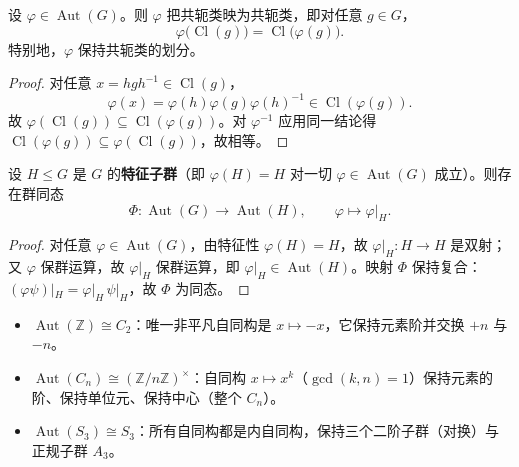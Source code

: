 \begin{property}[自同构保持共轭类]\label{prop:automorphism_preserves_conjugacy}
设 $\varphi \in \operatorname{Aut}(G)$。则 $\varphi$ 把共轭类映为共轭类，即对任意 $g\in G$，
\[
\varphi\bigl(\operatorname{Cl}(g)\bigr) = \operatorname{Cl}\bigl(\varphi(g)\bigr).
\]
特别地，$\varphi$ 保持共轭类的划分。
\end{property}

\begin{proof}
对任意 $x = hgh^{-1} \in \operatorname{Cl}(g)$，
\[
\varphi(x) = \varphi(h)\varphi(g)\varphi(h)^{-1} \in \operatorname{Cl}(\varphi(g)).
\]
故 $\varphi(\operatorname{Cl}(g))\subseteq \operatorname{Cl}(\varphi(g))$。对 $\varphi^{-1}$ 应用同一结论得 $\operatorname{Cl}(\varphi(g))\subseteq \varphi(\operatorname{Cl}(g))$，故相等。
\end{proof}

\begin{lemma}[自同构限制到特征子群]\label{lem:automorphism_restricts_characteristic}
设 $H\le G$ 是 $G$ 的\textbf{特征子群}（即 $\varphi(H)=H$ 对一切 $\varphi\in\operatorname{Aut}(G)$ 成立）。则存在群同态
\[
\Phi: \operatorname{Aut}(G) \to \operatorname{Aut}(H),\qquad \varphi \mapsto \varphi|_H.
\]
\end{lemma}

\begin{proof}
对任意 $\varphi\in\operatorname{Aut}(G)$，由特征性 $\varphi(H)=H$，故 $\varphi|_H: H\to H$ 是双射；又 $\varphi$ 保群运算，故 $\varphi|_H$ 保群运算，即 $\varphi|_H\in\operatorname{Aut}(H)$。映射 $\Phi$ 保持复合：$(\varphi\psi)|_H=\varphi|_H\,\psi|_H$，故 $\Phi$ 为同态。
\end{proof}

\begin{example}[典型群的自同构群不变量]\label{ex:automorphism_invariants_examples}
\begin{itemize}
    \item $\operatorname{Aut}(\mathbb{Z}) \cong C_2$：唯一非平凡自同构是 $x\mapsto -x$，它保持元素阶并交换 $+n$ 与 $-n$。
    \item $\operatorname{Aut}(C_n) \cong (\mathbb{Z}/n\mathbb{Z})^\times$：自同构 $x\mapsto x^k$（$\gcd(k,n)=1$）保持元素的阶、保持单位元、保持中心（整个 $C_n$）。
    \item $\operatorname{Aut}(S_3) \cong S_3$：所有自同构都是内自同构，保持三个二阶子群（对换）与正规子群 $A_3$。
\end{itemize}
\end{example}

